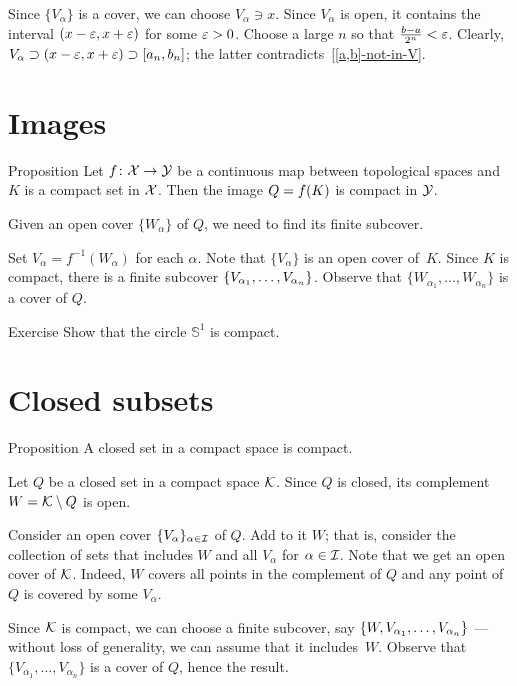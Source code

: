 Since $\{V_\alpha\}$ is a cover, we can choose $V_\alpha\ni x$.
Since $V_\alpha$ is open, it contains the interval $(x-\varepsilon,x+\varepsilon)$ for some $\varepsilon>0$.
Choose a large $n$ so that $\tfrac{b-a}{2^n}<\varepsilon$.
Clearly, $V_\alpha\supset (x-\varepsilon,x+\varepsilon)\supset[a_n,b_n]$;
the latter contradicts~\ref{[a,b]-not-in-V}.\qeds



\section{Images}

\begin{thm}{Proposition}
Let $f\colon\mathcal{X}\to\mathcal{Y}$ be a continuous map between topological spaces and $K$ is a compact set in $\mathcal{X}$.
Then the image $Q\z=f(K)$ is compact in $\mathcal{Y}$.
\end{thm}

Given an open cover $\{W_\alpha\}$ of $Q$, we need to find its finite subcover.

Set $V_\alpha=f^{-1}(W_\alpha)$ for each $\alpha$.
Note that $\{V_\alpha\}$ is an open cover of~$K$.
Since $K$ is compact, there is a finite subcover $\{V_{\alpha_1},\z\dots, V_{\alpha_n}\}$.
Observe that $\{W_{\alpha_1},\dots, W_{\alpha_n}\}$ is a cover of $Q$.
\qeds

\begin{thm}{Exercise}\label{ex:S1-compact}
Show that the circle $\mathbb{S}^1$ is compact.
\end{thm}

\section{Closed subsets}

\begin{thm}{Proposition}\label{prop:compact-closed}
A closed set in a compact space is compact.
\end{thm}

Let $Q$ be a closed set in a compact space $\mathcal{K}$.
Since $Q$ is closed, its complement $W=\mathcal{K}\setminus Q$ is open.

Consider an open cover $\{V_\alpha\}_{\alpha\in\mathcal{I}}$ of $Q$.
Add to it $W$; that is, consider the collection of sets that includes $W$ and all $V_\alpha$ for $\alpha\in\mathcal{I}$.
Note that we get an open cover of $\mathcal{K}$.
Indeed, $W$ covers all points in the complement of $Q$ and any point of $Q$ is covered by some $V_\alpha$.

Since $\mathcal{K}$ is compact, we can choose a finite subcover, say $\{W,V_{\alpha_1},\z\dots,V_{\alpha_n}\}$ --- without loss of generality, we can assume that it includes~$W$.
Observe that $\{V_{\alpha_1},\dots,V_{\alpha_n}\}$ is a cover of $Q$, hence the result.
\qeds

